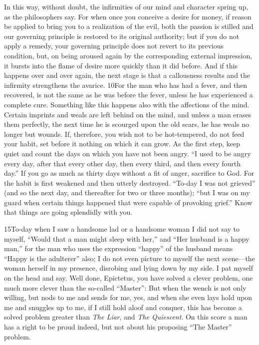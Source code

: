 In this way, without doubt, the infirmities of our mind and character spring up, as the philosophers say. For when once you conceive a desire for money, if reason be applied to bring you to a realization of the evil, both the passion is stilled and our governing principle is restored to its original authority; but if you do not apply a remedy, your governing principle does not revert to its previous condition, but, on being aroused again by the corresponding external impression, it bursts into the flame of desire more quickly than it did before. And if this happens over and over again, the next stage is that a callousness results and the infirmity strengthens the avarice. 10For the man who has had a fever, and then recovered, is not the same as he was before the fever, unless he has experienced a complete cure. Something like this happens also with the affections of the mind. Certain imprints and weals are left behind on the mind, and unless a man erases them perfectly, the next time he is scourged upon the old scars, he has weals no longer but wounds. If, therefore, you wish not to be hot-tempered, do not feed your habit, set before it nothing on which it can grow. As the first step, keep quiet and count the days on which you have not been angry. ``I used to be angry every day, after that every other day, then every third, and then every fourth day.'' If you go as much as thirty days without a fit of anger, sacrifice to God. For the habit is first weakened and then utterly destroyed. ``To-day I was not grieved'' (and so the next day, and thereafter for two or three months); ``but I was on my guard when certain things happened that were capable of provoking grief.'' Know that things are going splendidly with you.

15To-day when I saw a handsome lad or a handsome woman I did not say to myself, ``Would that a man might sleep with her,'' and ``Her husband is a happy man,'' for the man who uses the expression ``happy'' of the husband means ``Happy is the adulterer'' also; I do not even picture to myself the next scene—the woman herself in my presence, disrobing and lying down by my side. I pat myself on the head and say. Well done, Epictetus, you have solved a clever problem, one much more clever than the so-called ``Master'': But when the wench is not only willing, but nods to me and sends for me, yes, and when she even lays hold upon me and snuggles up to me, if I still hold aloof and conquer, this has become a solved problem greater than \emph{The Liar}, and \emph{The Quiescent}. On this score a man has a right to be proud indeed, but not about his proposing ``The Master'' problem.

